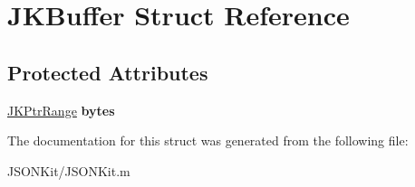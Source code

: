 \hypertarget{struct_j_k_buffer}{\section{J\+K\+Buffer Struct Reference}
\label{struct_j_k_buffer}
}
\subsection*{Protected Attributes}
\begin{DoxyCompactItemize}
\item 
\hypertarget{struct_j_k_buffer_a82b694da8e8cc43e460b548581b1dc03}{\hyperlink{struct_j_k_ptr_range}{J\+K\+Ptr\+Range} {\bfseries bytes}}\label{struct_j_k_buffer_a82b694da8e8cc43e460b548581b1dc03}

\end{DoxyCompactItemize}


The documentation for this struct was generated from the following file\+:\begin{DoxyCompactItemize}
\item 
J\+S\+O\+N\+Kit/J\+S\+O\+N\+Kit.\+m\end{DoxyCompactItemize}
